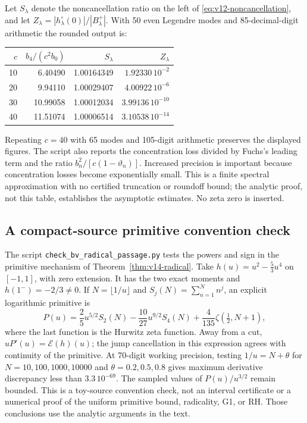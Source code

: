 \documentclass[11pt]{article}
\theoremstyle{remark}
\begin{document}
Let $S_\lambda$ denote the noncancellation ratio on the left of
\eqref{eq:v12-noncancellation}, and let
$Z_\lambda=|h_\lambda^\circ(0)|/|B_\lambda^+|$. With 50 even Legendre
modes and 85-decimal-digit arithmetic the rounded output is:
\begin{center}
\begin{tabular}{rrrr}
\toprule
$c$ & $b_4/(c^2b_0)$ & $S_\lambda$ & $Z_\lambda$\\
\midrule
10 & 6.40490  & 1.00164349 & $1.92330\,10^{-2}$\\
20 & 9.94110  & 1.00029407 & $4.00922\,10^{-6}$\\
30 & 10.99058 & 1.00012034 & $3.99136\,10^{-10}$\\
40 & 11.51074 & 1.00006514 & $3.10538\,10^{-14}$\\
\bottomrule
\end{tabular}
\end{center}
Repeating $c=40$ with 65 modes and 105-digit arithmetic preserves the
displayed figures. The script also reports the concentration loss divided
by Fuchs's leading term and the ratio $b_n^2/[c(1-\vartheta_n)]$.
Increased precision is important because concentration losses become
exponentially small. This is a finite spectral approximation with no
certified truncation or roundoff bound; the analytic proof, not this
table, establishes the asymptotic estimates. No zeta zero is inserted.

\subsection*{A compact-source primitive convention check}
The script \texttt{check\_bv\_radical\_passage.py} tests the powers and
sign in the primitive mechanism of Theorem~\ref{thm:v14-radical}.
Take $h(u)=u^2-\frac53u^4$ on $[-1,1]$, with zero extension. It has
the two exact moments and $h(1^-)=-2/3\ne0$. If $N=\lfloor1/u\rfloor$
and $S_j(N)=\sum_{n=1}^N n^j$, an explicit logarithmic primitive is
\[
 P(u)=\frac25u^{5/2}S_2(N)-\frac{10}{27}u^{9/2}S_4(N)
       +\frac4{135}\zeta(\tfrac12,N+1),
\]
where the last function is the Hurwitz zeta function. Away from a cut,
$uP'(u)=\mathcal E(h)(u)$; the jump cancellation in this expression
agrees with continuity of the primitive. At 70-digit working precision,
testing $1/u=N+\theta$ for $N=10,100,1000,10000$ and
$\theta=0.2,0.5,0.8$ gives maximum derivative discrepancy less than
$3.3\,10^{-69}$. The sampled values of $P(u)/u^{3/2}$ remain bounded.
This is a toy-source convention check, not an interval certificate or
a numerical proof of the uniform primitive bound, radicality, G1, or RH.
Those conclusions use the analytic arguments in the text.
\end{document}
